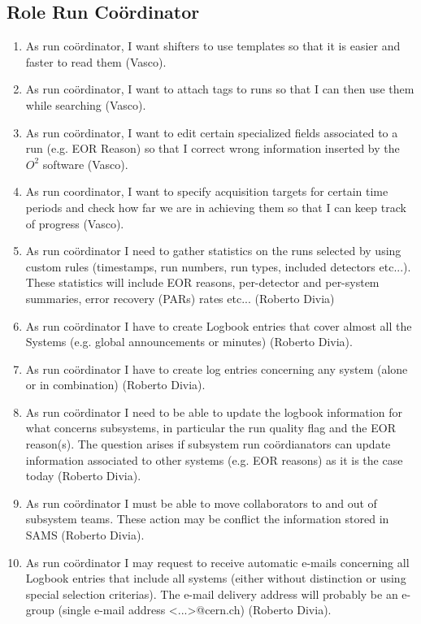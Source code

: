 \subsection{Role Run Co\"ordinator}
\begin{enumerate}
  \item As run co\"ordinator, I want shifters to use templates so that it is easier and faster to read them (Vasco). 
  \item As run co\"ordinator, I want to attach tags to runs so that I can then use them while searching (Vasco). 
  \item As run co\"ordinator, I want to edit certain specialized fields associated to a run (e.g. EOR Reason) so that I correct wrong information inserted by the $O^2$ software (Vasco). 
  \item As run coordinator, I want to specify acquisition targets for certain time periods and check how far we are in achieving them so that I can keep track of progress (Vasco). 
  \item As run co\"ordinator I need to gather statistics on the runs selected by using custom rules (timestamps, run numbers, run types, included detectors etc...). These statistics will include EOR reasons, per-detector and per-system summaries, error recovery (PARs) rates etc... (Roberto Divia)
  \item As run co\"ordinator I have to create Logbook entries that cover almost all the Systems (e.g. global announcements or minutes) (Roberto Divia).
  \item As run co\"ordinator I have to create log entries concerning any system (alone or in combination) (Roberto Divia).
  \item As run co\"ordinator I need to be able to update the logbook information for what concerns subsystems, in particular the run quality flag and the EOR reason(s). The question arises if subsystem run co\"ordianators can update information associated to other systems (e.g. EOR reasons) as it is the case today (Roberto Divia).
  \item As run co\"ordinator I must be able to move collaborators to and out of subsystem teams. These action may be conflict the information stored in SAMS (Roberto Divia).
  \item As run co\"ordinator I may request to receive automatic e-mails concerning all Logbook entries that include all systems (either without distinction or using special selection criterias). The e-mail delivery address will probably be an e-group (single e-mail address <...>@cern.ch) (Roberto Divia).

\end{enumerate}
